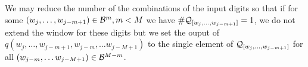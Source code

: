 We may reduce the number of the combinations of the input digits so that if for some $(w_j,\dots, w_{j-m+1})\in\mathcal{B}^m, m<M$ we have   $\#\mathcal{Q}_{[w_j,\dots, w_{j-m+1}]}=1$, we do not extend the window for these digits but we set the ouput of $q(w_j,\dots, w_{j-m+1}, w_{j-m}, \dots w_{j-M+1})$ to the single element of $\mathcal{Q}_{[w_j,\dots, w_{j-m+1}]}$ for all $(w_{j-m}, \dots w_{j-M+1})\in \mathcal{B}^{M-m}$. 

















